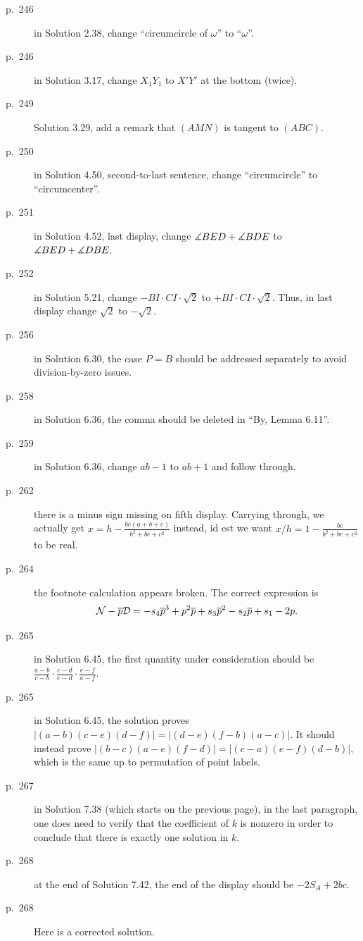 \documentclass[11pt]{scrartcl}
\begin{document}
\begin{description}
\item[p.\  246] in Solution 2.38, change ``circumcircle of $\omega$'' to ``$\omega$''.
\item[p.\  246] in Solution 3.17, change $X_1Y_1$ to $X'Y'$ at the bottom (twice).
\item[p.\  249] Solution 3.29, add a remark that $(AMN)$ is tangent to $(ABC)$.
\item[p.\  250] in Solution 4.50, second-to-last sentence,
  change ``circumcircle'' to ``circumcenter''.
\item[p.\  251] in Solution 4.52, last display,
  change $\measuredangle BED + \measuredangle BDE$ to $\measuredangle BED + \measuredangle DBE$.
\item[p.\  252] in Solution 5.21, change $-BI \cdot CI \cdot \sqrt2$ to $+ BI \cdot CI \cdot \sqrt2$.
  Thus, in last display change $\sqrt2$ to $-\sqrt2$.
\item[p.\  256] in Solution 6.30, the case $P=B$ should be addressed separately
  to avoid division-by-zero issues.
\item[p.\  258] in Solution 6.36, the comma should be deleted in ``By, Lemma 6.11''.
\item[p.\  259] in Solution 6.36, change $ab-1$ to $ab+1$ and follow through.
\item[p.\  262] there is a minus sign missing on fifth display.
  Carrying through, we actually get $x = h - \frac{bc(a+b+c)}{b^2+bc+c^2}$ instead,
  id est we want $x/h = 1 - \frac{bc}{b^2+bc+c^2}$ to be real.
\item[p.\  264] the footnote calculation appears broken. The correct expression is
  \[ \mathcal{N} - \overline p \mathcal{D}
    = -s_4 \overline p^3 + p^2 \overline p + s_3 \overline p^2 - s_2 \overline p + s_1 - 2 p.  \]
\item[p.\  265] in Solution 6.45, the first quantity under consideration should be
  $\frac{a-b}{c-b}\cdot\frac{c-d}{e-d}\cdot\frac{e-f}{a-f}$.
\item[p.\  265] in Solution 6.45, the solution proves $|(a-b)(c-e)(d-f)|=|(d-e)(f-b)(a-c)|$.
  It should instead prove $|(b-c)(a-e)(f-d)|=|(c-a)(e-f)(d-b)|$,
  which is the same up to permutation of point labels.
\item[p.\ 267] in Solution 7.38 (which starts on the previous page),
  in the last paragraph, one does need to verify that the coefficient of $k$ is nonzero
  in order to conclude that there is exactly one solution in $k$.
\item[p.\  268] at the end of Solution 7.42, the end of the display should be $-2S_A+2bc$.
\item[p.\  268] 
  Here is a corrected solution.


\end{description}
\end{document}
